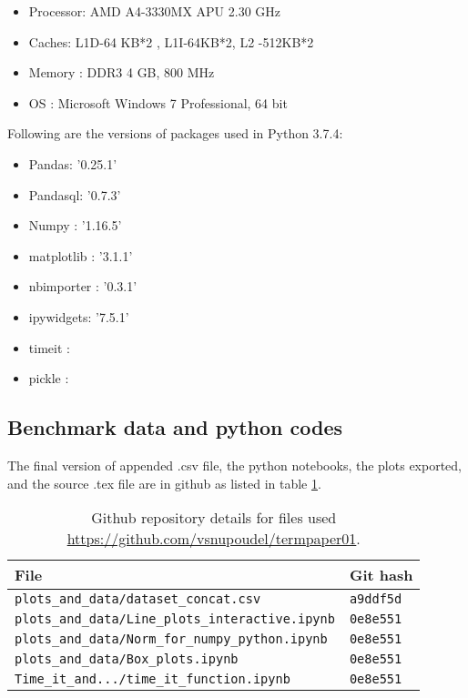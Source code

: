\documentclass[sigconf, nonacm, natbib, screen, balance=False]{acmart}
\begin{document}
\begin{itemize}
\item Processor:    AMD A4-3330MX APU  2.30 GHz
\item Caches:       L1D-64 KB*2 , L1I-64KB*2, L2 -512KB*2
\item Memory :      DDR3 4 GB, 800 MHz
\item OS :          Microsoft Windows 7 Professional, 64 bit
\end{itemize}


Following are the versions of packages used in Python 3.7.4:
\begin{multicols}{2}
\begin{itemize}
\item Pandas:    '0.25.1'
\item Pandasql:    '0.7.3'
\item Numpy :      '1.16.5'
\item matplotlib :   '3.1.1'
\item nbimporter :  '0.3.1'
\item ipywidgets: '7.5.1'
\item timeit :         
\item pickle :  
\end{itemize}
\end{multicols}

\subsection{Benchmark data and python codes}\label{sec:githubfiles}
The final version of appended .csv file, the python notebooks, the plots exported, and the source .tex file are in github as listed in table \ref{tab:hashes}.

\begin{table}[ht]
\caption{Github repository details for files used 
\url{https://github.com/vsnupoudel/termpaper01}.}
\label{tab:hashes}
\begin{tabular}{|l|l|}
\hline
File & Git hash 
\\\hline
\verb!plots_and_data/dataset_concat.csv! & \verb!a9ddf5d! \\
\verb!plots_and_data/Line_plots_interactive.ipynb! & \verb!0e8e551! \\
\verb!plots_and_data/Norm_for_numpy_python.ipynb! & \verb!0e8e551! \\
\verb!plots_and_data/Box_plots.ipynb! & \verb!0e8e551! \\
\verb!Time_it_and.../time_it_function.ipynb! & \verb!0e8e551! \\
\hline
\end{tabular}
\end{table}
\end{document}
